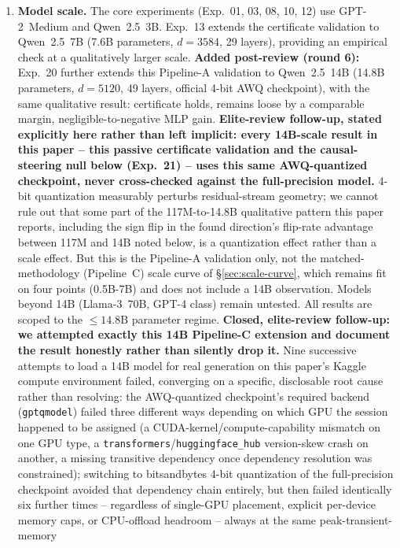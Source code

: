 \documentclass[10pt,twocolumn]{article}
\begin{document}
\begin{enumerate}[leftmargin=*, topsep=2pt, itemsep=2pt]
\item \textbf{Model scale.} The core experiments (Exp.~01, 03, 08, 10,
  12) use GPT-2~Medium and Qwen~2.5~3B. Exp.~13 extends the certificate
  validation to Qwen~2.5~7B (7.6B parameters, $d=3584$, 29 layers),
  providing an empirical check at a qualitatively larger scale.
  \textbf{Added post-review (round 6):} Exp.~20 further extends this
  Pipeline-A validation to Qwen~2.5~14B (14.8B parameters, $d=5120$, 49
  layers, official 4-bit AWQ checkpoint), with the same qualitative
  result: certificate holds, remains loose by a comparable margin,
  negligible-to-negative MLP gain. \textbf{Elite-review follow-up,
  stated explicitly here rather than left implicit: every 14B-scale
  result in this paper -- this passive certificate validation and the
  causal-steering null below (Exp.~21) -- uses this same AWQ-quantized
  checkpoint, never cross-checked against the full-precision model.}
  4-bit quantization measurably perturbs residual-stream geometry; we
  cannot rule out that some part of the 117M-to-14.8B qualitative
  pattern this paper reports, including the sign flip in the found
  direction's flip-rate advantage between 117M and 14B noted below, is
  a quantization effect rather than a scale effect. But this is the
  Pipeline-A
  validation only, not the matched-methodology (Pipeline~C) scale curve
  of \S\ref{sec:scale-curve}, which remains fit on four points
  (0.5B-7B) and does not include a 14B observation. Models beyond 14B
  (Llama-3~70B, GPT-4 class) remain untested. All results are scoped to
  the $\leq 14.8$B parameter regime. \textbf{Closed, elite-review
  follow-up: we attempted exactly this 14B Pipeline-C extension and
  document the result honestly rather than silently drop it.} Nine
  successive attempts to load a 14B model for real generation on this
  paper's Kaggle compute environment failed, converging on a specific,
  disclosable root cause rather than resolving: the AWQ-quantized
  checkpoint's required backend (\texttt{gptqmodel}) failed three
  different ways depending on which GPU the session happened to be
  assigned (a CUDA-kernel/compute-capability mismatch on one GPU type,
  a \texttt{transformers}/\texttt{huggingface\_hub} version-skew crash
  on another, a missing transitive dependency once dependency
  resolution was constrained); switching to bitsandbytes 4-bit
  quantization of the full-precision checkpoint avoided that dependency
  chain entirely, but then failed identically six further times --
  regardless of single-GPU placement, explicit per-device memory caps,
  or CPU-offload headroom -- always at the same peak-transient-memory

\end{enumerate}
\end{document}
